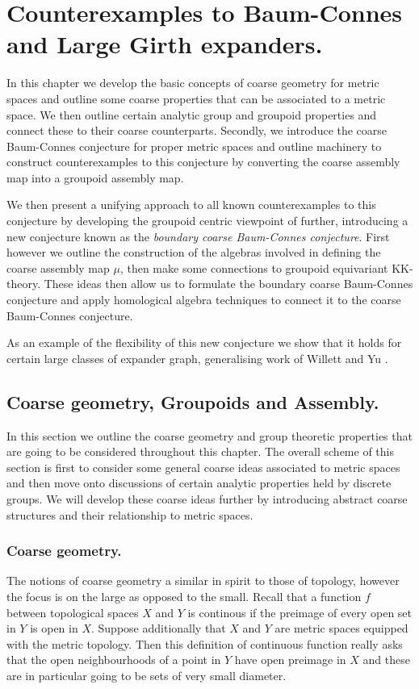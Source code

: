 \chapter{Counterexamples to Baum-Connes and Large Girth expanders.}
In this chapter we develop the basic concepts of coarse geometry for metric spaces and outline some coarse properties that can be associated to a metric space. We then outline certain analytic group and groupoid properties and connect these to their coarse counterparts. Secondly, we introduce the coarse Baum-Connes conjecture for proper metric spaces and outline machinery to construct counterexamples to this conjecture by converting the coarse assembly map into a groupoid assembly map.

We then present a unifying approach to all known counterexamples to this conjecture by developing the groupoid centric viewpoint of \cite{MR1911663} further, introducing a new conjecture known as the \textit{boundary coarse Baum-Connes conjecture}. First however we outline the construction of the algebras involved in defining the coarse assembly map $\mu$, then make some connections to groupoid equivariant KK-theory. These ideas then allow us to formulate the boundary coarse Baum-Connes conjecture and apply homological algebra techniques to connect it to the coarse Baum-Connes conjecture.

As an example of the flexibility of this new conjecture we show that it holds for certain large classes of expander graph, generalising work of Willett and Yu \cite{explg1}.

\section{Coarse geometry, Groupoids and Assembly.}
In this section we outline the coarse geometry and group theoretic properties that are going to be considered throughout this chapter. The overall scheme of this section is first to consider some general coarse ideas associated to metric spaces and then move onto discussions of certain analytic properties held by discrete groups. We will develop these coarse ideas further by introducing abstract coarse structures and their relationship to metric spaces.

\subsection{Coarse geometry.}
The notions of coarse geometry a similar in spirit to those of topology, however the focus is on the large as opposed to the small. Recall that a function $f$ between topological spaces $X$ and $Y$ is continous if the preimage of every open set in $Y$ is open in $X$. Suppose additionally that $X$ and $Y$ are metric spaces equipped with the metric topology. Then this definition of continuous function really asks that the open neighbourhoods of a point in $Y$ have open preimage in $X$ and these are in particular going to be sets of very small diameter. 

